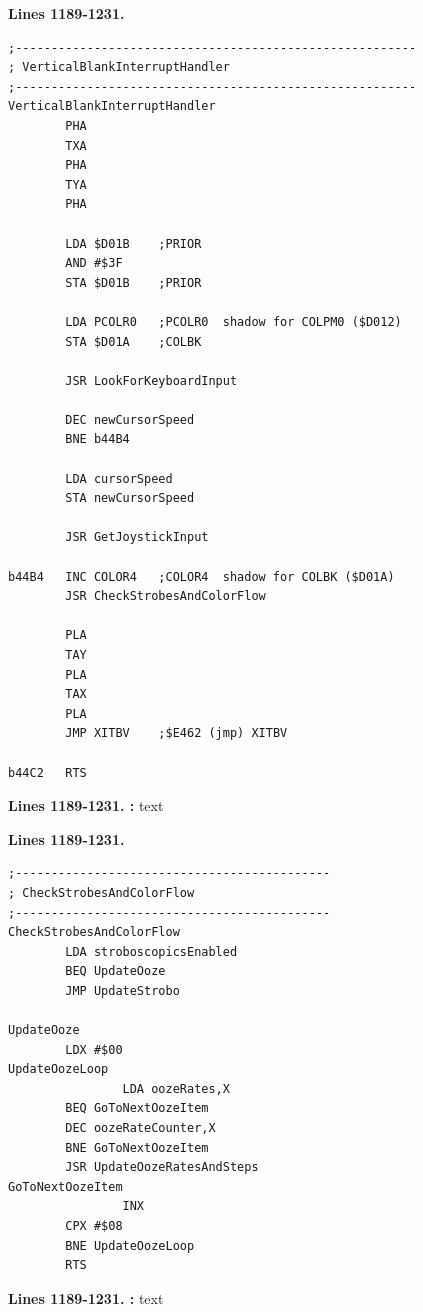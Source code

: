 \textbf{Lines 1189-1231. } 
\begin{lstlisting}
;--------------------------------------------------------
; VerticalBlankInterruptHandler
;--------------------------------------------------------
VerticalBlankInterruptHandler
        PHA 
        TXA 
        PHA 
        TYA 
        PHA 

        LDA $D01B    ;PRIOR
        AND #$3F
        STA $D01B    ;PRIOR

        LDA PCOLR0   ;PCOLR0  shadow for COLPM0 ($D012)
        STA $D01A    ;COLBK

        JSR LookForKeyboardInput

        DEC newCursorSpeed
        BNE b44B4

        LDA cursorSpeed
        STA newCursorSpeed

        JSR GetJoystickInput

b44B4   INC COLOR4   ;COLOR4  shadow for COLBK ($D01A)
        JSR CheckStrobesAndColorFlow

        PLA 
        TAY 
        PLA 
        TAX 
        PLA 
        JMP XITBV    ;$E462 (jmp) XITBV

b44C2   RTS 

\end{lstlisting}
\clearpage

\textbf{Lines 1189-1231. :} 
text

\clearpage
\textbf{Lines 1189-1231. } 
\begin{lstlisting}
;--------------------------------------------
; CheckStrobesAndColorFlow
;--------------------------------------------
CheckStrobesAndColorFlow
        LDA stroboscopicsEnabled
        BEQ UpdateOoze
        JMP UpdateStrobo

UpdateOoze   
        LDX #$00
UpdateOozeLoop   
				LDA oozeRates,X
        BEQ GoToNextOozeItem
        DEC oozeRateCounter,X
        BNE GoToNextOozeItem
        JSR UpdateOozeRatesAndSteps
GoToNextOozeItem   
				INX 
        CPX #$08
        BNE UpdateOozeLoop
        RTS 

\end{lstlisting}
\clearpage

\textbf{Lines 1189-1231. :} 
text

